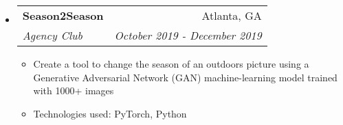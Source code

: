 \documentclass[letterpaper,10pt]{article}
\makeatletter
\newcommand{\resitem}[1]{\item #1 \vspace{-2pt}}
\newcommand{\ressubheading}[4]{
\begin{tabular*}{7.0in}{l@{\extracolsep{\fill}}r}
		\textbf{#1} & #2 \\
		\textit{#3} & \textit{#4} \\
\end{tabular*}\vspace{-6pt}}
\makeatother
\begin{document}
\begin{itemize}
\item
    \ressubheading{Season2Season}{Atlanta, GA}{Agency Club}{October 2019 - December 2019}
    \begin{itemize}
        \resitem{Create a tool to change the season of an outdoors picture using a Generative Adversarial Network (GAN) machine-learning model trained with 1000+ images}
        \resitem{Technologies used: PyTorch, Python}
    \end{itemize}

\end{itemize}
\end{document}
